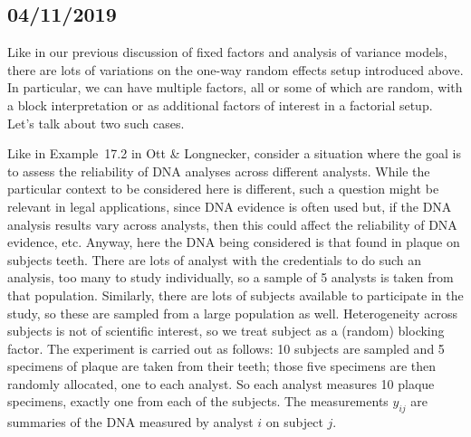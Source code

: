 \documentclass[a4paper, 12pt]{article}
\theoremstyle{plain}
\theoremstyle{definition}
\theoremstyle{remark}
\begin{document}
\subsection*{04/11/2019}

Like in our previous discussion of fixed factors and analysis of variance models, there are lots of variations on the one-way random effects setup introduced above.  In particular, we can have multiple factors, all or some of which are random, with a block interpretation or as additional factors of interest in a factorial setup.  Let's talk about two such cases.  

Like in Example~17.2 in Ott \& Longnecker, consider a situation where the goal is to assess the reliability of DNA analyses across different analysts.  While the particular context to be considered here is different, such a question might be relevant in legal applications, since DNA evidence is often used but, if the DNA analysis results vary across analysts, then this could affect the reliability of DNA evidence, etc.  Anyway, here the DNA being considered is that found in plaque on subjects teeth.  There are lots of analyst with the credentials to do such an analysis, too many to study individually, so a sample of 5 analysts is taken from that population.  Similarly, there are lots of subjects available to participate in the study, so these are sampled from a large population as well.  Heterogeneity across subjects is not of scientific interest, so we treat subject as a (random) blocking factor.  The experiment is carried out as follows: 10 subjects are sampled and 5 specimens of plaque are taken from their teeth; those five specimens are then randomly allocated, one to each analyst.  So each analyst measures 10 plaque specimens, exactly one from each of the subjects.  The measurements $y_{ij}$ are summaries of the DNA measured by analyst $i$ on subject $j$.  
\end{document}
